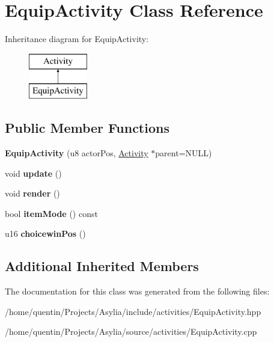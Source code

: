 \hypertarget{classEquipActivity}{\section{Equip\-Activity Class Reference}
\label{classEquipActivity}
}
Inheritance diagram for Equip\-Activity\-:\begin{figure}[H]
\begin{center}
\leavevmode
\includegraphics[height=2.000000cm]{classEquipActivity}
\end{center}
\end{figure}
\subsection*{Public Member Functions}
\begin{DoxyCompactItemize}
\item 
\hypertarget{classEquipActivity_a737d1eed35be03426cea3041156513d7}{{\bfseries Equip\-Activity} (u8 actor\-Pos, \hyperlink{classActivity}{Activity} $\ast$parent=N\-U\-L\-L)}\label{classEquipActivity_a737d1eed35be03426cea3041156513d7}

\item 
\hypertarget{classEquipActivity_a436fdca122c478bae6bc576671300302}{void {\bfseries update} ()}\label{classEquipActivity_a436fdca122c478bae6bc576671300302}

\item 
\hypertarget{classEquipActivity_aaac0d2082b216194c7195ad49007dee3}{void {\bfseries render} ()}\label{classEquipActivity_aaac0d2082b216194c7195ad49007dee3}

\item 
\hypertarget{classEquipActivity_a18415dcf81da2c535ed905162c0b7cc2}{bool {\bfseries item\-Mode} () const }\label{classEquipActivity_a18415dcf81da2c535ed905162c0b7cc2}

\item 
\hypertarget{classEquipActivity_a7018ec9ad5ad1bb225e1728029a44b30}{u16 {\bfseries choicewin\-Pos} ()}\label{classEquipActivity_a7018ec9ad5ad1bb225e1728029a44b30}

\end{DoxyCompactItemize}
\subsection*{Additional Inherited Members}


The documentation for this class was generated from the following files\-:\begin{DoxyCompactItemize}
\item 
/home/quentin/\-Projects/\-Asylia/include/activities/Equip\-Activity.\-hpp\item 
/home/quentin/\-Projects/\-Asylia/source/activities/Equip\-Activity.\-cpp\end{DoxyCompactItemize}
